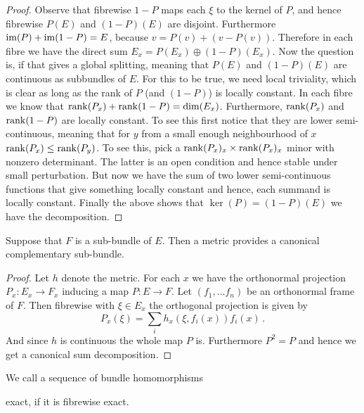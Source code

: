 \begin{proof}
	Observe that fibrewise $1-P$ maps each $\xi$ to the kernel of $P$, and hence fibrewise $P(E)$ and $(1-P)(E)$ are disjoint.  Furthermore $\mathrm{im}(P)+\mathrm{im}(1-P)=E$, because $v=P(v)+(v-P(v))$. Therefore in each fibre we have the direct sum $E_x=P(E_x)\oplus (1-P)(E_x)$. Now the question is, if that gives a global splitting, meaning that $P(E)$ and $(1-P)(E)$ are continuous as subbundles of $E$. For this to be true, we need local triviality, which is clear as long as the rank of $P$ (and $(1-P)$) is locally constant. In each fibre we know that $\operatorname{\mathrm{rank}}(P_x)+\operatorname{\mathrm{rank}}(1-P)=\dim(E_x)$. Furthermore, $\operatorname{\mathrm{rank}}(P_x)$ and $\operatorname{\mathrm{rank}}(1-P)$ are locally constant. To see this first notice that they are lower semi-continuous, meaning that for $y$ from a small enough neighbourhood of $x$ $\operatorname{\mathrm{rank}}(P_x)\leq \operatorname{\mathrm{rank}}(P_y)$. To see this, pick a $\operatorname{\mathrm{rank}}(P_x)_x\times \operatorname{\mathrm{rank}}(P_x)_x$ minor with nonzero determinant. The latter is an open condition and hence stable under small perturbation. But now we have the sum of two lower semi-continuous functions that give something locally constant and hence, each summand is locally constant. Finally the above shows that $\ker(P)=(1-P)(E)$ we have the decomposition.
\end{proof}
\begin{lemma} \label{lem:kTheo-metricInducedComplement}
	Suppose that $F$ is a sub-bundle of $E$. Then a metric provides a canonical complementary sub-bundle.
\end{lemma}
\begin{proof}Let $h$ denote the metric.	For each $x$ we have the orthonormal projection $P_x:E_x\to F_x$ inducing a map $P:E \to F$. Let $(f_1,\dots f_n)$ be an orthonormal frame of $F$. Then fibrewise with $\xi\in E_x$ the orthogonal projection is given by
		\begin{equation*}
		P_x(\xi)=\sum_i h_x(\xi,f_i(x))f_i(x)\,.
	\end{equation*} And since $h$ is continuous the whole map $P$ is. Furthermore $P^2=P$ and hence we get a canonical sum decomposition.
\end{proof}
\begin{definition}
	We call a sequence of bundle homomorphisms
	\begin{center}
	\end{center} exact, if it is fibrewise exact.
\end{definition}
